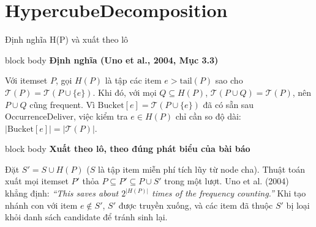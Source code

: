 \documentclass[9pt, aspectratio=169]{beamer}
\newenvironment{quietblock}[1]{%
  \begin{beamercolorbox}[wd=\linewidth,sep=5pt,rounded=true]{block body}
  {\color{psdearblue}\bfseries #1}\par\vspace{2pt}\footnotesize
}{%
  \end{beamercolorbox}
}
\begin{document}
\section{HypercubeDecomposition}
\begin{frame}{Định nghĩa H(P) và xuất theo lô}
  \begin{quietblock}{Định nghĩa (Uno et al., 2004, Mục 3.3)}
    Với itemset $P$, gọi $H(P)$ là tập các item $e>\mathrm{tail}(P)$ sao
    cho $\mathcal T(P)=\mathcal T(P\cup\{e\})$. Khi đó, với mọi $Q\subseteq
    H(P)$, $\mathcal T(P\cup Q)=\mathcal T(P)$, nên $P\cup Q$ cũng frequent.
    Vì $\mathrm{Bucket}[e]=\mathcal T(P\cup\{e\})$ đã có sẵn sau
    OccurrenceDeliver, việc kiểm tra $e\in H(P)$ chỉ cần so độ dài:
    $|\mathrm{Bucket}[e]|=|\mathcal T(P)|$.
  \end{quietblock}

  \vspace{0.2cm}
  \begin{quietblock}{Xuất theo lô, theo đúng phát biểu của bài báo}
    Đặt $S'=S\cup H(P)$ ($S$ là tập item miễn phí tích lũy từ node cha).
    Thuật toán xuất mọi itemset $P'$ thỏa $P\subseteq P'\subseteq P\cup S'$
    trong một lượt. Uno et al. (2004) khẳng định: \textit{``This saves
    about $2^{|H(P)|}$ times of the frequency counting.''} Khi tạo nhánh
    con với item $e\notin S'$, $S'$ được truyền xuống, và các item đã thuộc
    $S'$ bị loại khỏi danh sách candidate để tránh sinh lại.
  \end{quietblock}
\end{frame}
\end{document}
